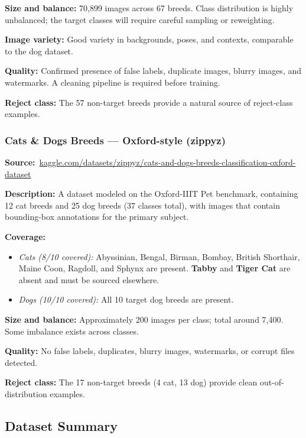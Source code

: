\documentclass[10pt,twocolumn,letterpaper]{article}
\begin{document}
\textbf{Size and balance:} 70,899 images across 67 breeds. Class distribution is highly unbalanced; the target classes will require careful sampling or reweighting.

\textbf{Image variety:} Good variety in backgrounds, poses, and contexts, comparable to the dog dataset.

\textbf{Quality:} Confirmed presence of false labels, duplicate images, blurry images, and watermarks. A cleaning pipeline is required before training.

\textbf{Reject class:} The 57 non-target breeds provide a natural source of reject-class examples.

\subsubsection{Cats \& Dogs Breeds --- Oxford-style (zippyz)}

\textbf{Source:}~\url{kaggle.com/datasets/zippyz/cats-and-dogs-breeds-classification-oxford-dataset}

\textbf{Description:} A dataset modeled on the Oxford-IIIT Pet benchmark, containing 12 cat breeds and 25 dog breeds (37 classes total), with images that contain bounding-box annotations for the primary subject.

\textbf{Coverage:}
\begin{itemize}[leftmargin=*, topsep=2pt, itemsep=1pt]
  \item \textit{Cats (8/10 covered):} Abyssinian, Bengal, Birman, Bombay, British Shorthair, Maine Coon, Ragdoll, and Sphynx are present. \textbf{Tabby} and \textbf{Tiger Cat} are absent and must be sourced elsewhere.
  \item \textit{Dogs (10/10 covered):} All 10 target dog breeds are present.
\end{itemize}

\textbf{Size and balance:} Approximately 200 images per class; total around 7,400. Some imbalance exists across classes.

\textbf{Quality:} No false labels, duplicates, blurry images, watermarks, or corrupt files detected.

\textbf{Reject class:} The 17 non-target breeds (4 cat, 13 dog) provide clean out-of-distribution examples.

\subsection{Dataset Summary}
\end{document}
